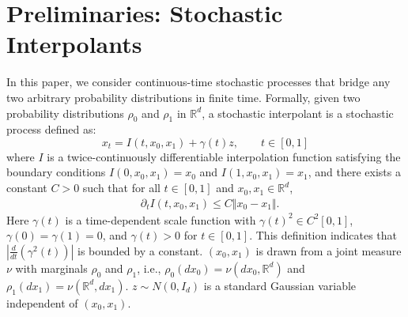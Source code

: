 
\section{Preliminaries: Stochastic Interpolants}
\label{sec:preliminaries}



In this paper, we consider continuous-time stochastic processes that bridge any two arbitrary probability distributions in finite time. 
Formally, given two probability distributions $\rho_0$ and $\rho_1$ in $\mathbb{R}^d$, a stochastic interpolant \cite{interpolation, flows, albergo2024coupling} is a stochastic process defined as: 
\begin{equation}
    x_t=I(t,x_0,x_1)+\gamma(t)z,\qquad t\in[0,1]
    \label{eq:stochastic-interpolant}
\end{equation}
where $I$ is a twice-continuously differentiable interpolation function satisfying the boundary conditions $I(0,x_0,x_1)=x_0$ and $I(1,x_0,x_1)=x_1$, and there exists a constant $C>0$ such that for all $t\in[0,1]$ and $x_0,x_1\in\mathbb{R}^d$, 
    \begin{equation}
        \begin{aligned}
      &\partial_tI(t,x_0,x_1)\le C\Vert x_0-x_1\Vert.
        \end{aligned}
        \label{eq:I-lip}
    \end{equation}
Here $\gamma(t)$ is a time-dependent scale function with $\gamma(t)^2\in C^2[0,1]$, $\gamma(0)=\gamma(1)=0$, and $\gamma(t)>0$ for $t\in[0,1]$. This definition indicates that $\left|\frac{d}{dt}(\gamma^2(t))\right|$ is bounded by a constant.
$(x_0,x_1)$ is drawn from a joint measure $\nu$ with marginals $\rho_0$ and $\rho_1$, i.e., $\rho_0(dx_0)=\nu(dx_0,\mathbb{R}^d)$ and $\rho_1(dx_1)=\nu(\mathbb{R}^d,dx_1).$
$z\sim N(0,I_d)$ is a standard Gaussian variable independent of $(x_0,x_1)$.

